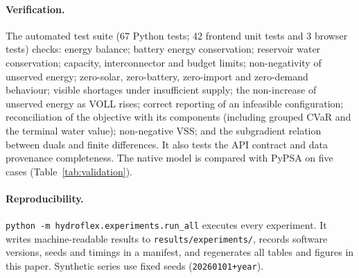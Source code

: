 \paragraph{Verification.} The automated test suite (67 Python tests; 42 frontend unit tests and 3 browser
tests) checks: energy balance; battery energy conservation; reservoir water conservation; capacity,
interconnector and budget limits; non-negativity of unserved energy; zero-solar, zero-battery, zero-import and
zero-demand behaviour; visible shortages under insufficient supply; the non-increase of unserved energy as VOLL
rises; correct reporting of an infeasible configuration; reconciliation of the objective with its components
(including grouped CVaR and the terminal water value); non-negative VSS; and the subgradient relation between
duals and finite differences. It also tests the API contract and data provenance completeness. The native
model is compared with PyPSA on five cases (Table~\ref{tab:validation}).

\paragraph{Reproducibility.} \texttt{python -m hydroflex.experiments.run\_all} executes every experiment. It
writes machine-readable results to \texttt{results/experiments/}, records software versions, seeds and timings
in a manifest, and regenerates all tables and figures in this paper. Synthetic series use fixed seeds
(\texttt{20260101+year}).
